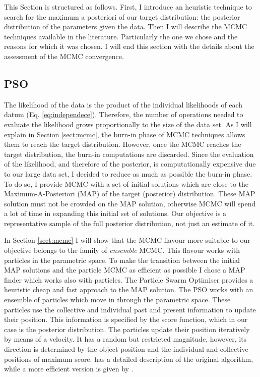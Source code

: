 This Section is structured as follows. First, I introduce an heuristic technique to search for the maximum a posteriori of our target distribution: the posterior distribution of the parameters given the data. Then I will describe the MCMC techniques available in the literature. Particularly the one we chose and the reasons for which it was chosen. I will end this section with the details about the assessment of the MCMC convergence.

\subsection{PSO}

The likelihood of the data is the product of the individual likelihoods of each datum (Eq. \ref{eq:independece}). Therefore, the number of operations needed to evaluate the likelihood grows proportionally to the size of the data set. As I will explain in Section \ref{sect:mcmc}, the burn-in phase of MCMC techniques allows them to reach the target distribution. However, once the MCMC reaches the target distribution, the burn-in computations are discarded. Since the evaluation of the likelihood, and therefore of the posterior, is computationally expensive due to our large data set, I decided to reduce as much as possible the burn-in phase. To do so, I provide MCMC with a set of initial solutions which are close to the Maximum-A-Posteriori (MAP) of the target (posterior) distribution. These MAP solution must not be crowded on the MAP solution, otherwise MCMC will spend a lot of time in expanding this initial set of solutions.  Our objective is a representative sample of the full posterior distribution, not just an estimate of it.

In Section \ref{sect:mcmc} I will show that the MCMC flavour more suitable to our objective belongs to the family of \emph{ensemble} MCMC. This flavour works with particles in the parametric space. To make the transition between the initial MAP solutions and the particle MCMC as efficient as possible I chose a MAP finder which works also with particles. The Particle Swarm Optimiser \cite[PSO,][]{Kennedy1995} provides a heuristic cheap and fast approach to the MAP solution. The PSO works with an ensemble of particles which move in through the parametric space. These particles use the collective and individual past and present information to update their position. This information is specified by the score function, which in our case is the posterior distribution. The particles update their position iteratively by means of a velocity. It has a random but restricted magnitude, however, its direction is determined by the object position and the individual and collective positions of maximum score. \citet{Kennedy1995} has a detailed description of the original algorithm, while a more efficient version is given by \citep{Clerc2002}.

